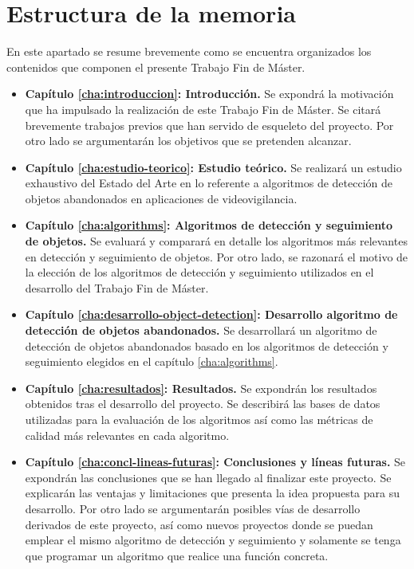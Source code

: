 \section{Estructura de la memoria}
\label{sec:estructura-memoria}
En este apartado se resume brevemente como se encuentra organizados los contenidos que componen el presente Trabajo Fin de Máster.

\begin{itemize}
    \item \textbf{Capítulo \ref{cha:introduccion}: Introducción.} Se expondrá la motivación que ha impulsado la realización de este Trabajo Fin de Máster. Se citará brevemente trabajos previos que han servido de esqueleto del proyecto. Por otro lado se argumentarán los objetivos que se pretenden alcanzar.
    \item \textbf{Capítulo \ref{cha:estudio-teorico}: Estudio teórico.} Se realizará un estudio exhaustivo del Estado del Arte en lo referente a algoritmos de detección de objetos abandonados en aplicaciones de videovigilancia.
    \item \textbf{Capítulo \ref{cha:algorithms}: Algoritmos de detección y seguimiento de objetos.} Se evaluará y comparará en detalle los algoritmos más relevantes en detección y seguimiento de objetos. Por otro lado, se razonará el motivo de la elección de los algoritmos de detección y seguimiento utilizados en el desarrollo del Trabajo Fin de Máster.
    \item \textbf{Capítulo \ref{cha:desarrollo-object-detection}: Desarrollo algoritmo de detección de objetos abandonados.} Se desarrollará un algoritmo de detección de objetos abandonados basado en los algoritmos de detección y seguimiento elegidos en el capítulo \ref{cha:algorithms}.
    \item \textbf{Capítulo \ref{cha:resultados}: Resultados.} Se expondrán los resultados obtenidos tras el desarrollo del proyecto. Se describirá las bases de datos utilizadas para la evaluación de los algoritmos así como las métricas de calidad más relevantes en cada algoritmo.
    \item \textbf{Capítulo \ref{cha:concl-lineas-futuras}: Conclusiones y líneas futuras.} Se expondrán las conclusiones que se han llegado al finalizar este proyecto. Se explicarán las ventajas y limitaciones que presenta la idea propuesta para su desarrollo. Por otro lado se argumentarán posibles vías de desarrollo derivados de este proyecto, así como nuevos proyectos donde se puedan emplear el mismo algoritmo de detección y seguimiento y solamente se tenga que programar un algoritmo que realice una función concreta.

\end{itemize}
